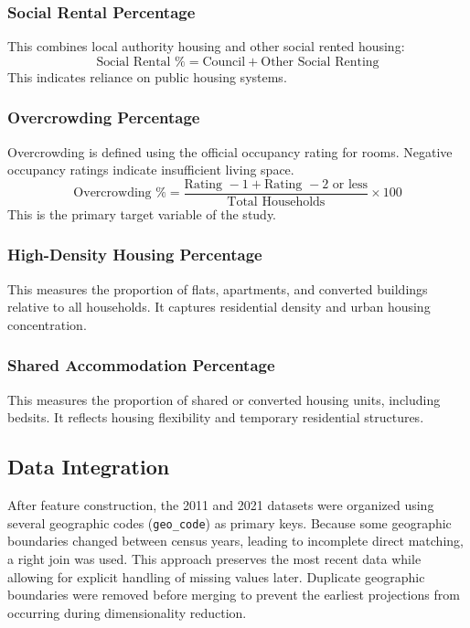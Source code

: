 \documentclass[conference]{IEEEtran}
\begin{document}
\subsubsection{Social Rental Percentage}
This combines local authority housing and other social rented housing:
\begin{equation}
\text{Social Rental \%} = \text{Council} + \text{Other Social Renting}
\end{equation}
This indicates reliance on public housing systems.

\subsubsection{Overcrowding Percentage}
Overcrowding is defined using the official occupancy rating for rooms. Negative occupancy ratings indicate insufficient living space.
\begin{equation}
\text{Overcrowding \%} = \frac{\text{Rating } -1 + \text{Rating } -2 \text{ or less}}{\text{Total Households}} \times 100
\end{equation}
This is the primary target variable of the study.

\subsubsection{High-Density Housing Percentage}
This measures the proportion of flats, apartments, and converted buildings relative to all households. It captures residential density and urban housing concentration.

\subsubsection{Shared Accommodation Percentage}
This measures the proportion of shared or converted housing units, including bedsits. It reflects housing flexibility and temporary residential structures.

\subsection{Data Integration}
After feature construction, the 2011 and 2021 datasets were organized using several geographic codes (\texttt{geo\_code}) as primary keys. Because some geographic boundaries changed between census years, leading to incomplete direct matching, a right join was used. This approach preserves the most recent data while allowing for explicit handling of missing values later. Duplicate geographic boundaries were removed before merging to prevent the earliest projections from occurring during dimensionality reduction.
\end{document}
